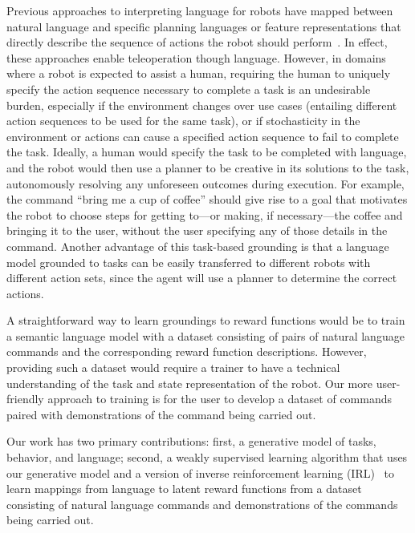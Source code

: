 \documentclass[conference]{IEEEtran}
\begin{document}
Previous approaches to interpreting language for
robots have mapped between natural language and specific planning
languages or feature representations that directly describe the
sequence of actions the robot should perform~\citep{kollar10,
  tellex11, matuszek12, matuszek12a, chen11}. In effect,
these approaches enable teleoperation though language.  
However, in domains where a robot is expected to assist
a human, requiring the human to uniquely specify the action
sequence necessary to complete a task is an undesirable burden, especially
if the environment changes over use cases (entailing different
action sequences to be used for the same task), or if stochasticity in the
environment or actions can cause a specified action sequence to fail to complete
the task. Ideally, a human would specify the task to be completed with language, and the robot would then use a planner to be creative
in its solutions to the task, autonomously resolving any unforeseen
outcomes during execution. For example, the command ``bring me a cup
of coffee'' should give rise to a goal that motivates the robot to
choose steps for getting to---or making, if necessary---the coffee and 
bringing it to the user, without
the user specifying any of those details in the command. Another advantage
of this task-based grounding is that a language model grounded to tasks
can be easily transferred to different robots with different action sets,
since the agent will use a planner to determine the correct actions.


A straightforward way to learn groundings to reward functions would be to train a semantic
language model with a dataset consisting of pairs of natural language commands
and the corresponding reward function descriptions. However,
providing such a dataset would require a trainer to have a technical understanding
of the task and state representation of the robot. Our more user-friendly approach
to training is for the user to develop a dataset of commands paired with
demonstrations of the command being carried out. 

Our work has two primary contributions: first, a generative model of tasks, behavior, 
and language; second, a weakly supervised learning algorithm that uses
our generative model and a version of inverse reinforcement learning (IRL)~\cite{ng00}
to learn mappings from language to latent reward functions 
from a dataset consisting of natural language commands and demonstrations
of the commands being carried out.
\end{document}
